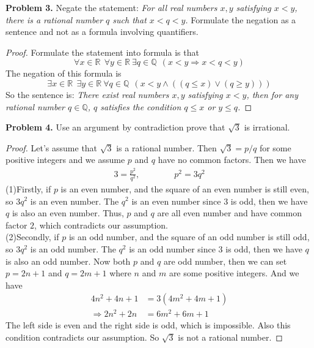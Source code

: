 \documentclass[12pt,leqno]{amsart}
\begin{document}
\noindent
{\bf Problem 3.}
Negate the statement: {\em For all real numbers $x,y$ satisfying $x<y$, there
is a rational number $q$ such that $x<q<y$.} Formulate
the negation as a sentence and not as a formula involving quantifiers.
\begin{proof}
Formulate the statement into formula is that 
$$
    \forall x \in\mathbb{R}\ \ \forall y\in\mathbb{R}\ \exists q \in \mathbb{Q}\ \ ( x < y \Rightarrow x < q < y)
$$
The negation of this formula is 
$$
    \exists x \in\mathbb{R}\ \ \exists y\in\mathbb{R}\ \forall q \in \mathbb{Q}\ \ ( x < y \wedge ((q \leq x) \vee (q \geq y)) )
$$
So the sentence is: {\em There exist real numbers $x,y$ satisfying $x<y$, then for any rational number $q \in \mathbb{Q}$, $q$ satisfies the condition $q \leq x$ or $y \leq q$.}
\end{proof}


\medskip

\noindent
{\bf Problem 4.}
Use an argument by contradiction prove that $\sqrt{3}$ is irrational.
\begin{proof}
Let's assume that $\sqrt{3}$ is a rational number. Then $\sqrt{3} = p/q$ for some positive integers and we assume $p$ and $q$ have no common factors. Then we have 
\begin{align*}
    3 = \frac{p^2}{q^2}, \qquad \qquad p^2 = 3 q^2
\end{align*}
(1)Firstly, if $p$ is an even number, and the square of an even number is still even, so $3q^2$ is an even number. The $q^2$ is an even number since $3$ is odd, then we have $q$ is also an even number. Thus, $p$ and $q$ are all even number and have common factor $2$, which contradicts our assumption. \\
(2)Secondly, if $p$ is an odd number, and the square of an odd number is still odd, so $3q^2$ is an odd number. The $q^2$ is an odd number since $3$ is odd, then we have $q$ is also an odd number. Now both $p$ and $q$ are odd number, then we can set $p = 2n + 1$ and $q = 2m + 1$ where $n$ and $m$ are some positive integers. And we have
\begin{align*}
    4n^2 + 4n + 1 &= 3(4m^2 + 4m + 1) \\
    \Rightarrow 2n^2 + 2n &= 6m^2 + 6m + 1
\end{align*}
The left side is even and the right side is odd, which is impossible. Also this condition contradicts our assumption. So $\sqrt{3}$ is not a rational number.
\end{proof}
\end{document}
